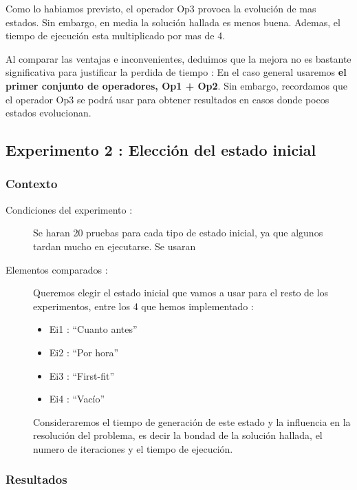 \documentclass{article}
\begin{document}
Como lo habiamos previsto, el operador Op3 provoca la evolución de mas estados.
Sin embargo, en media la solución hallada es menos buena. Ademas, el tiempo de
ejecución esta multiplicado por mas de 4.

Al comparar las ventajas e inconvenientes, deduimos que la mejora no es bastante
significativa para justificar la perdida de tiempo : En el caso general usaremos
\textbf{el primer conjunto de operadores, Op1 + Op2}. Sin embargo, recordamos
que el operador Op3 se podrá usar para obtener resultados en casos donde pocos
estados evolucionan.

\subsection{Experimento 2 : Elección del estado inicial}

\subsubsection{Contexto}

\begin{description}
\item[Condiciones del experimento :] Se haran 20 pruebas para cada tipo de
estado inicial, ya que algunos tardan mucho en ejecutarse. Se usaran 
\item[Elementos comparados :] Queremos elegir el estado inicial que vamos a usar
para el resto de los experimentos, entre los 4 que hemos implementado :
\begin{itemize}
\item Ei1 : ``Cuanto antes''
\item Ei2 : ``Por hora''
\item Ei3 : ``First-fit''
\item Ei4 : ``Vacío''
\end{itemize}

Consideraremos el tiempo de generación de este estado y la influencia en la
resolución del problema, es decir la bondad de la solución hallada, el numero de
iteraciones y el tiempo de ejecución.
\end{description}

\subsubsection{Resultados}
\end{document}

